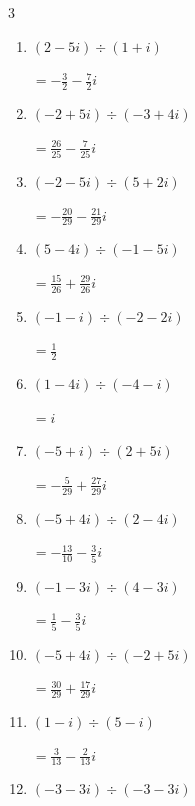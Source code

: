 \begin{multicols}{3}
\begin{enumerate}
        $\displaystyle =\frac{23}{26}+\frac{11}{26}i$

  \item $\displaystyle (2-5i)\div(1+i)$

        $\displaystyle =-\frac{3}{2}-\frac{7}{2}i$

  \item $\displaystyle (-2+5i)\div(-3+4i)$

        $\displaystyle =\frac{26}{25}-\frac{7}{25}i$

  \item $\displaystyle (-2-5i)\div(5+2i)$

        $\displaystyle =-\frac{20}{29}-\frac{21}{29}i$

  \item $\displaystyle (5-4i)\div(-1-5i)$

        $\displaystyle =\frac{15}{26}+\frac{29}{26}i$

  \item $\displaystyle (-1-i)\div(-2-2i)$

        $\displaystyle =\frac{1}{2}$

  \item $\displaystyle (1-4i)\div(-4-i)$

        $\displaystyle =i$

  \item $\displaystyle (-5+i)\div(2+5i)$

        $\displaystyle =-\frac{5}{29}+\frac{27}{29}i$

  \item $\displaystyle (-5+4i)\div(2-4i)$

        $\displaystyle =-\frac{13}{10}-\frac{3}{5}i$

\columnbreak %

  \item $\displaystyle (-1-3i)\div(4-3i)$

        $\displaystyle =\frac{1}{5}-\frac{3}{5}i$

  \item $\displaystyle (-5+4i)\div(-2+5i)$

        $\displaystyle =\frac{30}{29}+\frac{17}{29}i$

  \item $\displaystyle (1-i)\div(5-i)$

        $\displaystyle =\frac{3}{13}-\frac{2}{13}i$

  \item $\displaystyle (-3-3i)\div(-3-3i)$


\end{enumerate}
\end{multicols}
